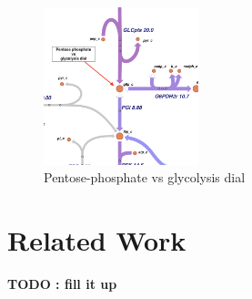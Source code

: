 \documentclass[12pt,chapterheads]{ucsd}
\begin{document}
\begin{figure}[h] 
\centering
\includegraphics[width=0.4\textwidth]{dial_2}
\caption[Pentose-phosphate vs glycolysis dial]
{Pentose-phosphate vs glycolysis dial }
\label{fig:dial_2}
\end{figure}

\chapter{Related Work}
\textbf{TODO : fill it up}\\
\end{document}
